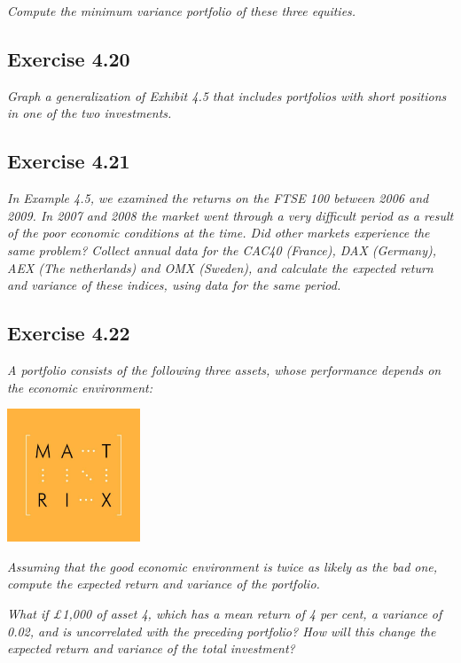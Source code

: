 \documentclass[]{book}
\theoremstyle{definition}
\theoremstyle{definition}
\theoremstyle{remark}
\begin{document}
\emph{Compute the minimum variance portfolio of these three equities.}
\citep[p.119]{book}

\subsection{Exercise 4.20}\label{exercise-4.20}

\emph{Graph a generalization of Exhibit 4.5 that includes portfolios
with short positions in one of the two investments.} \citep[p.119]{book}

\subsection{Exercise 4.21}\label{exercise-4.21}

\emph{In Example 4.5, we examined the returns on the FTSE 100 between
2006 and 2009. In 2007 and 2008 the market went through a very difficult
period as a result of the poor economic conditions at the time. Did
other markets experience the same problem? Collect annual data for the
CAC40 (France), DAX (Germany), AEX (The netherlands) and OMX (Sweden),
and calculate the expected return and variance of these indices, using
data for the same period.} \citep[p.119]{book}

\subsection{Exercise 4.22}\label{exercise-4.22}

\emph{A portfolio consists of the following three assets, whose
performance depends on the economic environment:} \citep[p.119]{book}

\begin{center}\includegraphics[width=150px]{figures/matrix} \end{center}

\emph{Assuming that the good economic environment is twice as likely as
the bad one, compute the expected return and variance of the portfolio.}
\citep[p.119]{book}

\emph{What if £1,000 of asset 4, which has a mean return of 4 per cent,
a variance of 0.02, and is uncorrelated with the preceding portfolio?
How will this change the expected return and variance of the total
investment?} \citep[p.119]{book}
\end{document}
